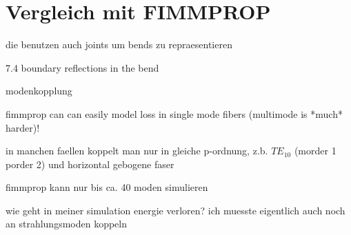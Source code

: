 \documentclass[DIV19,twocolumn]{scrartcl}
\begin{document}
\section{Vergleich mit FIMMPROP}
die benutzen auch joints um bends zu repraesentieren

7.4 boundary reflections in the bend

modenkopplung

fimmprop can can easily model loss in single mode fibers (multimode is
*much* harder)!

in manchen faellen koppelt man nur in gleiche p-ordnung, z.b. $TE_{10}$
(morder 1 porder 2) und horizontal gebogene faser

fimmprop kann nur bis ca. 40 moden simulieren

wie geht in meiner simulation energie verloren? ich muesste eigentlich auch noch an strahlungsmoden koppeln
\end{document}
